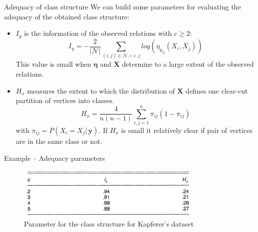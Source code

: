 \documentclass[aspectratio=169,xcolor=dvipsnames]{beamer}
\newcommand{\setn}{\mathcal{N}}
\newcommand{\vecy}{\textbf{y}}
\newcommand{\matx}{\textbf{X}}
\newcommand{\veceta}{\boldsymbol{\eta}}
\begin{document}
\begin{frame}{Adequacy of class structure}
We can build some parameters for evaluating the adequacy of the obtained class structure:
\pause 
\begin{itemize}[<+->]
    \item $I_y$ is the information of the observed relations with $c \geq 2$:
    $$
    I_y = -\frac{2}{|\setn|}\sum_{(i,j)\in\setn, i<j} log(\eta_{y_{ij}}(X_i, X_j))
    $$
    This value is small when $\veceta$ and $\matx$ determine to a large extent of the observed relations.
    \vspace{5pt}
    \item $H_x$ measures the extent to which the distribution of $\matx$ defines one clear-cut partition of vertices into classes.
    $$
    H_x = \frac{4}{n(n-1)}\sum_{i,j = 1}^n \pi_{ij}(1-\pi_{ij})
    $$
    with $\pi_{ij} = P(X_i=X_j|\,\vecy)$. If $H_x$ is small it relatively clear if pair of vertices are in the same class or not.
\end{itemize}
\end{frame}
\begin{frame}{Example – Adequacy parameters}

\begin{figure}
    \centering
    \includegraphics[keepaspectratio, height = 2.5cm]{utilities/adequacy_parameter.png}
    \caption{Parameter for the class structure for Kapferer's dataset}
    \label{fig:11}
\end{figure}
    
\end{frame}
\end{document}
